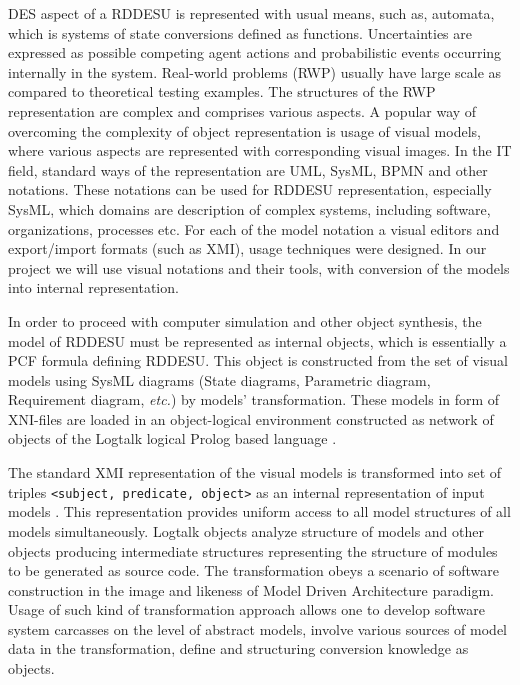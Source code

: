 \documentclass[conference,a4paper]{IEEEtran}
\begin{document}
DES aspect of a RDDESU is represented with usual means, such as, automata, which is systems of state conversions defined as functions.  Uncertainties are expressed as possible competing agent actions and probabilistic events occurring internally in the system.  Real-world problems (RWP) usually have large scale as compared to theoretical testing examples. The structures of the RWP representation are complex and comprises various aspects. A popular way of overcoming the complexity of object representation is usage of visual models, where various aspects are represented with corresponding visual images. In the IT field, standard ways of the representation are UML, SysML, BPMN and other notations. These notations can be used for RDDESU representation, especially SysML, which domains are description of complex systems, including software, organizations, processes etc. For each of the model notation a visual editors and export/import formats (such as XMI), usage techniques were designed. In our project we will use visual notations and their tools, with conversion of the models into internal representation.

In order to proceed with computer simulation and other object synthesis, the model of RDDESU must be represented as internal objects, which is essentially a PCF formula defining RDDESU. This object is constructed from the set of visual models using SysML diagrams (State diagrams, Parametric diagram, Requirement diagram, \emph{etc.}) by models' transformation. These models in form of XNI-files are loaded in an object-logical environment constructed as network of objects of the Logtalk logical Prolog based language \cite{b3}. %

The standard XMI representation of the visual models is transformed into set of triples \texttt{<subject, predicate, object>} as an internal representation of input models \cite{b2}. This representation provides uniform access to all model structures of all models simultaneously. %
Logtalk objects analyze structure of models and other objects producing intermediate structures representing the structure of modules to be generated as source code. The transformation obeys a scenario of software construction in the image and likeness of Model Driven Architecture paradigm. Usage of such kind of transformation approach allows one to develop software system carcasses on the level of abstract models, involve various sources of model data in the transformation, define and structuring conversion knowledge as objects.
\end{document}
